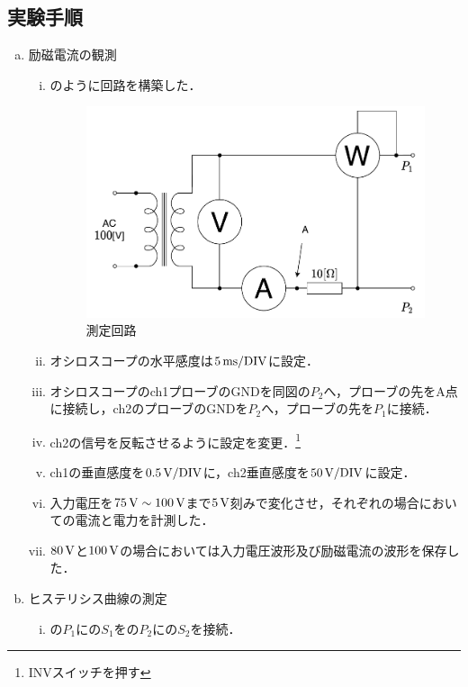 \subsection{実験手順}
\begin{enumerate}[(a)]
	\item 励磁電流の観測
	\begin{enumerate}[i)]
	\item {}のように回路を構築した．
	\begin{figure}[h]
	\centering
	\includegraphics[scale=1]{./fig/circ.pdf}
	\caption{測定回路}
	\label{fig:circ}
	\end{figure}
	\item オシロスコープの水平感度は$5\,\rm{ms/DIV}$に設定．
	\item オシロスコープのch1プローブのGNDを同図の$P_{2}$へ，プローブの先をA点に接続し，ch2のプローブのGNDを$P_{2}$へ，プローブの先を$P_{1}$に接続．
	\item ch2の信号を反転させるように設定を変更．\footnote{INVスイッチを押す}
	\item ch1の垂直感度を$0.5\,\rm{V/DIV}$に，ch2垂直感度を$50\,\rm{V/DIV}$に設定．
	\item 入力電圧を$75\,\rm{V}\sim 100\,\rm{V}$まで$5\,\rm{V}$刻みで変化させ，それぞれの場合においての電流と電力を計測した．
	\item $80\,\rm{V}$と$100\,\rm{V}$の場合においては入力電圧波形及び励磁電流の波形を保存した．
\end{enumerate}
\item ヒステリシス曲線の測定
\begin{enumerate}[i)]
	\item {}の$P_{1}$にの$S_{1}$をの$P_{2}$にの$S_{2}$を接続．
	\begin{figure}[h]

\end{figure}
\end{enumerate}
\end{enumerate}
